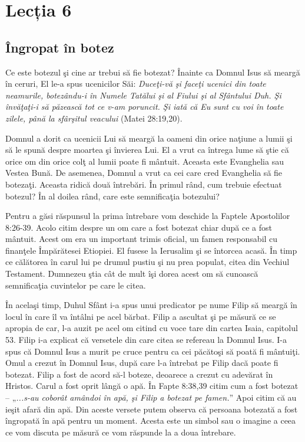 \newpage

\section*{Lecția 6}

\subsection*{Îngropat în botez}

Ce este botezul şi cine ar trebui să fie botezat? Înainte ca Domnul Isus să meargă în ceruri, El le-a spus ucenicilor Săi: \textit{Duceţi-vă şi faceţi ucenici din toate neamurile, botezându-i în Numele Tatălui şi al Fiului şi al Sfântului Duh. Şi învăţaţi-i să păzească tot ce v-am poruncit. Şi iată că Eu sunt cu voi în toate zilele, până la sfârşitul veacului} (Matei 28:19,20).

Domnul a dorit ca ucenicii Lui să meargă la oameni din orice naţiune a lumii şi să le spună despre moartea şi învierea Lui. El a vrut ca întrega lume să ştie că orice om din orice colţ al lumii poate fi mântuit. Aceasta este Evanghelia sau Vestea Bună. De asemenea, Domnul a vrut ca cei care cred Evanghelia să fie botezaţi. Aceasta ridică două întrebări. În primul rând, cum trebuie efectuat botezul? În al doilea rând, care este semnificaţia botezului?

Pentru a găsi răspunsul la prima întrebare vom deschide la Faptele Apostolilor 8:26-39. Acolo citim despre un om care a fost botezat chiar după ce a fost mântuit. Acest om era un important trimis oficial, un famen responsabil cu finanţele Împărătesei Etiopiei. El fusese la Ierusalim şi se întorcea acasă. În timp ce călătorea în carul lui pe drumul pustiu şi nu prea populat, citea din Vechiul Testament. Dumnezeu ştia cât de mult îşi dorea acest om să cunoască semnificaţia cuvintelor pe care le citea. 

În acelaşi timp, Duhul Sfânt i-a spus unui predicator pe nume Filip să meargă în locul în care îl va întâlni pe acel bărbat. Filip a ascultat şi pe măsură ce se apropia de car, l-a auzit pe acel om citind cu voce tare din cartea Isaia, capitolul 53. Filip i-a explicat că versetele din care citea se refereau la Domnul Isus. I-a spus că Domnul Isus a murit pe cruce pentru ca cei păcătoşi să poată fi mântuiţi. Omul a crezut în Domnul Isus, după care l-a întrebat pe Filip dacă poate fi botezat. Filip a fost de acord să-l boteze, deoarece a crezut cu adevărat în Hristos. Carul a fost oprit lângă o apă. În Fapte 8:38,39 citim cum a fost botezat – „\textit{...s-au coborât amândoi în apă, şi Filip a botezat pe famen.}” Apoi citim că au ieşit afară din apă. Din aceste versete putem observa că persoana botezată a fost îngropată în apă pentru un moment. Acesta este un simbol sau o imagine a ceea ce vom discuta pe măsură ce vom răspunde la a doua întrebare.

